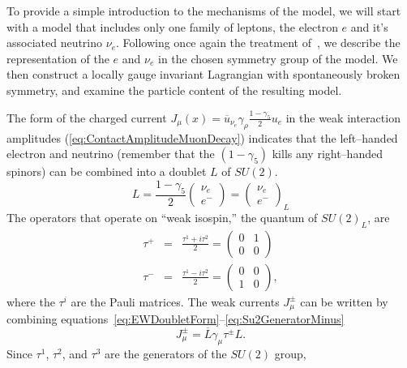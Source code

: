 To provide a simple introduction to the mechanisms of the model, we will start
with a model that includes only one family of leptons, the electron $e$ and it's
associated neutrino $\nu_e$. Following once again the treatment
of~\cite{Morii:SMandBSM}, we describe the representation of the $e$ and $\nu_e$
in the chosen symmetry group of the model.  We then construct a locally gauge
invariant Lagrangian with spontaneously broken symmetry, and examine the
particle content of the resulting model.

The form of the charged current $J_\mu(x) = \overline u_{\nu_e} \gamma_\rho
\frac{1 - \gamma_5}{2} u_e$ in the weak interaction amplitudes
(\ref{eq:ContactAmplitudeMuonDecay}) indicates that the left--handed electron
and neutrino 
(remember that the $(1-\gamma_5)$ kills any right--handed spinors) can be
combined into a doublet $L$ of $SU(2)$.  
\begin{equation}
  L = \frac{1 - \gamma_5}{2}
  \left(\begin{array}{c} \nu_e \\ e^- \end{array}\right)
    = \left(\begin{array}{c} \nu_e \\ e^- \end{array}\right)_L
      \label{eq:EWDoubletForm}
\end{equation}
The operators that operate on ``weak isospin,'' the quantum of $SU(2)_L$,
are \begin{eqnarray}
  \tau^+ &=& \frac{\tau^1 + i \tau^2}{2} = 
  \left(\begin{array}{cc} 0 & 1 \\ 0 & 0 \end{array}\right) 
    \label{eq:Su2GeneratorPlus} \\
  \tau^- &=& \frac{\tau^1 - i \tau^2}{2} = 
  \left(\begin{array}{cc} 0 & 0 \\ 1 & 0 \end{array}\right),
    \label{eq:Su2GeneratorMinus}
\end{eqnarray}
where the $\tau^i$ are the Pauli matrices. The weak currents $J_\mu^\pm$ can be
written by combining
equations~\ref{eq:EWDoubletForm}--\ref{eq:Su2GeneratorMinus}
\begin{equation}
  J_\mu^\pm = \overline L \gamma_\mu \tau^\pm L.
  \label{eq:WeakCurrentInSu2Doublets}
\end{equation}
Since $\tau^1$, $\tau^2$, and $\tau^3$ are the generators of the $SU(2)$ group,
